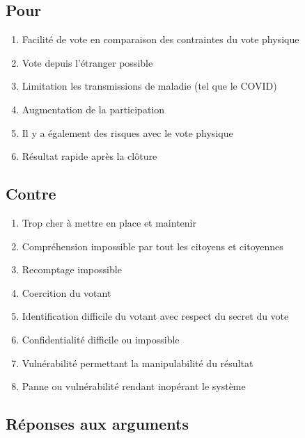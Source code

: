 \documentclass[../report]{subfiles}
\begin{document}
\newpage
\begin{multicols}{2}
\subsection{Pour}\label{sec:diff-meth:args:pour}
\begin{enumerate}
	\item Facilité de vote en comparaison des contraintes du vote physique
	\item Vote depuis l'étranger possible
	\item Limitation les transmissions de maladie (tel que le COVID)
	\item Augmentation de la participation
	\item Il y a également des risques avec le vote physique
	\item Résultat rapide après la clôture
\end{enumerate}
\newcolumn
\subsection{Contre}\label{sec:diff-meth:args:contre}
\begin{enumerate}
	\item Trop cher à mettre en place et maintenir
	\item Compréhension impossible par tout les citoyens et citoyennes
	\item Recomptage impossible
	\item Coercition du votant
	\item Identification difficile du votant avec respect du secret du vote
	\item Confidentialité difficile ou impossible
	\item Vulnérabilité permettant la manipulabilité du résultat
	\item Panne ou vulnérabilité rendant inopérant le système
\end{enumerate}
\end{multicols}

\subsection{Réponses aux arguments}
\end{document}
